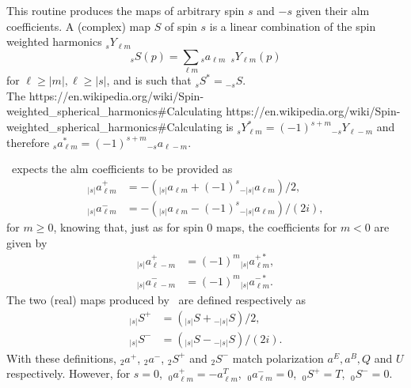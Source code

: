 \sloppy
{}\section[alm2map\_spin*]{ }
\label{sub:alm2map_spin}
\author{Eric Hivon}

\begin{facility}
{This routine produces the maps of arbitrary spin $s$ and $-s$ given their alm
coefficients.
%
A (complex) map $S$ of spin $s$ is a linear combination of the spin weighted harmonics ${_s}Y_{\ell m}$
\begin{equation}
	\label{eq:alm2map_spin_a}
	{_s}S(p) = \sum_{\ell m} {_s}a_{\ell m}\ \ {_s}Y_{\ell m}(p)
\end{equation}
for $\ell \ge |m|, \ell \ge |s|$,
and is such that ${_s}S^* = {_{-s}}S$.\\
The 
%
{https://en.wikipedia.org/wiki/Spin-weighted_spherical_harmonics\#Calculating}%
{https://en.wikipedia.org/wiki/Spin-weighted_spherical_harmonics\#Calculating}
is
${_s}Y_{\ell m}^* = (-1)^{s+m} {_{-s}}Y_{\ell -m}$
and therefore 
${_s}a_{\ell m}^* = (-1)^{s+m} {_{-s}}a_{\ell -m}$.


%
\thedocid\ expects the alm coefficients to be provided as
\begin{align}
	\label{eq:alm2map_spin_b}
	{_{|s|}}a^{+}_{\ell m} &= - ( {_{|s|}}a_{\ell m} + (-1)^s {_{-|s|}}a_{\ell m} )/2,\\
	{_{|s|}}a^{-}_{\ell m} &= - ( {_{|s|}}a_{\ell m} - (-1)^s {_{-|s|}}a_{\ell m} )/(2i),
\end{align}
for $m\ge 0$, knowing that, just as for spin 0 maps, the
coefficients for $m<0$ are given by 
\begin{align}
	\label{eq:alm2map_spin_c}
	{_{|s|}}a^{+}_{\ell-m} &= (-1)^m {_{|s|}}a^{+*}_{\ell m},\\
	{_{|s|}}a^{-}_{\ell-m} &= (-1)^m {_{|s|}}a^{-*}_{\ell m}.
\end{align}
%
The two (real) maps produced by \thedocid\ are defined respectively as
\begin{align}
	\label{eq:alm2map_spin_d}
	{_{|s|}}S^+ &= ({_{|s|}}S + {_{-|s|}}S)/2,\\
	{_{|s|}}S^- &= ({_{|s|}}S - {_{-|s|}}S)/(2i).
\end{align}
%
With these definitions, ${_2}a^{+}$, ${_2}a^{-}$, ${_2}S^+$ and ${_2}S^-$
match \healpix polarization $a^E, a^B, Q$ and $U$ respectively. However, for
$s=0$, $\ _{0}a^+_{\ell m} = -a^T_{\ell m}$, $\ _{0}a^-_{\ell m} = 0$, $\ {_0}S^+ = T$, $\ {_0}S^- = 0.$}
{\modAlmTools}
\end{facility}

